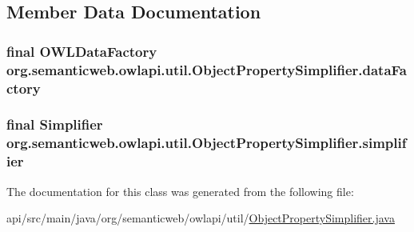 \subsection{Member Data Documentation}
\hypertarget{classorg_1_1semanticweb_1_1owlapi_1_1util_1_1_object_property_simplifier_a9e9e8e5d6e7804c0159f9f05b4c19c66}{
\subsubsection[{data\-Factory}]{\setlength{\rightskip}{0pt plus 5cm}final {\bf O\-W\-L\-Data\-Factory} org.\-semanticweb.\-owlapi.\-util.\-Object\-Property\-Simplifier.\-data\-Factory\hspace{0.3cm}{\ttfamily [private]}}}\label{classorg_1_1semanticweb_1_1owlapi_1_1util_1_1_object_property_simplifier_a9e9e8e5d6e7804c0159f9f05b4c19c66}
\hypertarget{classorg_1_1semanticweb_1_1owlapi_1_1util_1_1_object_property_simplifier_a26779a7a92ae72f1001d5c95eb54041d}{
\subsubsection[{simplifier}]{\setlength{\rightskip}{0pt plus 5cm}final Simplifier org.\-semanticweb.\-owlapi.\-util.\-Object\-Property\-Simplifier.\-simplifier\hspace{0.3cm}{\ttfamily [private]}}}\label{classorg_1_1semanticweb_1_1owlapi_1_1util_1_1_object_property_simplifier_a26779a7a92ae72f1001d5c95eb54041d}


The documentation for this class was generated from the following file\-:\begin{DoxyCompactItemize}
\item 
api/src/main/java/org/semanticweb/owlapi/util/\hyperlink{_object_property_simplifier_8java}{Object\-Property\-Simplifier.\-java}\end{DoxyCompactItemize}
